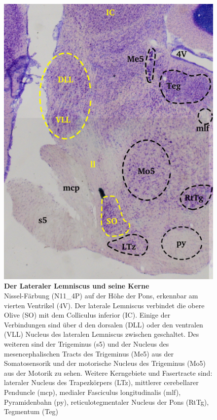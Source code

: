 \documentclass[12pt,a4paper,pdftex]{article}
\begin{document}
\begin{figure}[H]
    \centering
    \includegraphics{pictures/auditory/lateral_lemniscus.png}
    \caption[Der Lateraler Lemniscus und seine Kerne]{\textbf{Der Lateraler Lemniscus und seine Kerne}\\
    Nissel-Färbung (N11\_4P) auf der Höhe der Pons, erkennbar am vierten Ventrikel (4V).
    Der laterale Lemniscus verbindet die obere Olive (SO) mit dem Colliculus inferior (IC). Einige der Verbindungen sind über d den dorsalen (DLL) oder den ventralen (VLL) Nucleus des lateralen Lemniscus zwischen geschaltet. 
    Des weiteren sind der Trigeminus (s5) und der Nucleus des mesencephalischen Tracts des Trigeminus (Me5) aus der Somatosensorik und der motorische Nucleus des Trigeminus (Mo5) aus der Motorik zu sehen. 
    Weitere Kerngebiete und Fasertracte sind: lateraler Nucleus des Trapezkörpers (LTz), mittlerer cerebellarer Penduncle (mcp), medialer Fasciculus longitudinalis (mlf), Pyramidenbahn (py), reticulotegmentaler Nucleus der Pons (RtTg), Tegmentum (Teg)
    }
    \label{fig:lateraler_lemniscus}
\end{figure}
\end{document}
